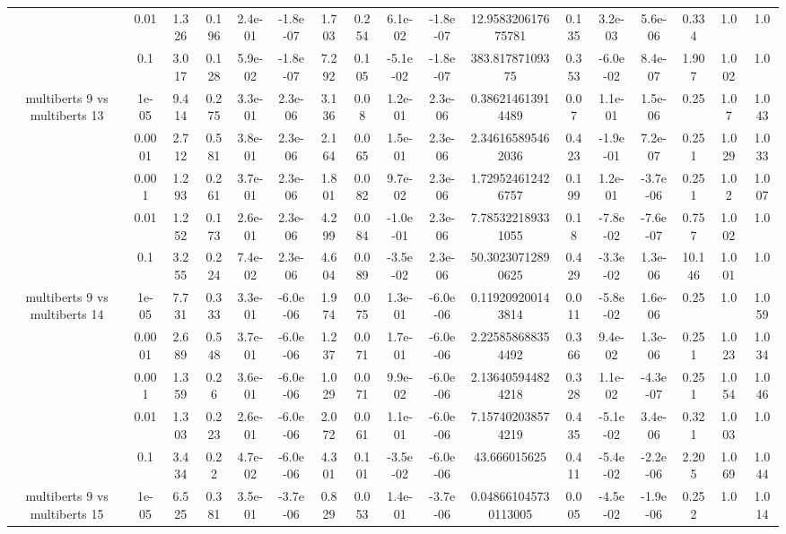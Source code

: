 \begin{tabular}{|c|c|c|c|c|c|c|c|c|c|c|c|c|c|c|c|c|}
 & 0.01 & 1.326 & 0.196 & 2.4e-01 & -1.8e-07 & 1.703 & 0.254 & 6.1e-02 & -1.8e-07 & 12.958320617675781 & 0.135 & 3.2e-03 & 5.6e-06 & 0.334 & 1.0 & 1.0 \\
 & 0.1 & 3.017 & 0.128 & 5.9e-02 & -1.8e-07 & 7.292 & 0.105 & -5.1e-02 & -1.8e-07 & 383.81787109375 & 0.353 & -6.0e-02 & 8.4e-07 & 1.907 & 1.002 & 1.0 \\
\hline
\multirow{5}{*}{multiberts 9 vs multiberts 13} & 1e-05 & 9.414 & 0.275 & 3.3e-01 & 2.3e-06 & 3.136 & 0.08 & 1.2e-01 & 2.3e-06 & 0.386214613914489 & 0.07 & 1.1e-01 & 1.5e-06 & 0.25 & 1.07 & 1.043 \\
 & 0.0001 & 2.712 & 0.581 & 3.8e-01 & 2.3e-06 & 2.164 & 0.065 & 1.5e-01 & 2.3e-06 & 2.346165895462036 & 0.423 & -1.9e-01 & 7.2e-07 & 0.251 & 1.029 & 1.033 \\
 & 0.001 & 1.293 & 0.261 & 3.7e-01 & 2.3e-06 & 1.801 & 0.082 & 9.7e-02 & 2.3e-06 & 1.729524612426757 & 0.199 & 1.2e-01 & -3.7e-06 & 0.251 & 1.02 & 1.007 \\
 & 0.01 & 1.252 & 0.173 & 2.6e-01 & 2.3e-06 & 4.299 & 0.084 & -1.0e-01 & 2.3e-06 & 7.785322189331055 & 0.18 & -7.8e-02 & -7.6e-07 & 0.757 & 1.002 & 1.0 \\
 & 0.1 & 3.255 & 0.224 & 7.4e-02 & 2.3e-06 & 4.604 & 0.089 & -3.5e-02 & 2.3e-06 & 50.30230712890625 & 0.429 & -3.3e-02 & 1.3e-06 & 10.146 & 1.001 & 1.0 \\
\hline
\multirow{5}{*}{multiberts 9 vs multiberts 14} & 1e-05 & 7.731 & 0.333 & 3.3e-01 & -6.0e-06 & 1.974 & 0.075 & 1.3e-01 & -6.0e-06 & 0.119209200143814 & 0.011 & -5.8e-02 & 1.6e-06 & 0.25 & 1.0 & 1.059 \\
 & 0.0001 & 2.689 & 0.548 & 3.7e-01 & -6.0e-06 & 1.237 & 0.071 & 1.7e-01 & -6.0e-06 & 2.225858688354492 & 0.366 & 9.4e-02 & 1.3e-06 & 0.251 & 1.023 & 1.034 \\
 & 0.001 & 1.359 & 0.26 & 3.6e-01 & -6.0e-06 & 1.029 & 0.071 & 9.9e-02 & -6.0e-06 & 2.136405944824218 & 0.328 & 1.1e-02 & -4.3e-07 & 0.251 & 1.054 & 1.046 \\
 & 0.01 & 1.303 & 0.223 & 2.6e-01 & -6.0e-06 & 2.072 & 0.061 & 1.1e-01 & -6.0e-06 & 7.157402038574219 & 0.435 & -5.1e-02 & 3.4e-06 & 0.321 & 1.003 & 1.0 \\
 & 0.1 & 3.434 & 0.22 & 4.7e-02 & -6.0e-06 & 4.301 & 0.101 & -3.5e-02 & -6.0e-06 & 43.666015625 & 0.411 & -5.4e-02 & -2.2e-06 & 2.205 & 1.069 & 1.044 \\
\hline
\multirow{5}{*}{multiberts 9 vs multiberts 15} & 1e-05 & 6.525 & 0.381 & 3.5e-01 & -3.7e-06 & 0.829 & 0.053 & 1.4e-01 & -3.7e-06 & 0.048661045730113005 & 0.005 & -4.5e-02 & -1.9e-06 & 0.252 & 1.0 & 1.014 \\

\end{tabular}
